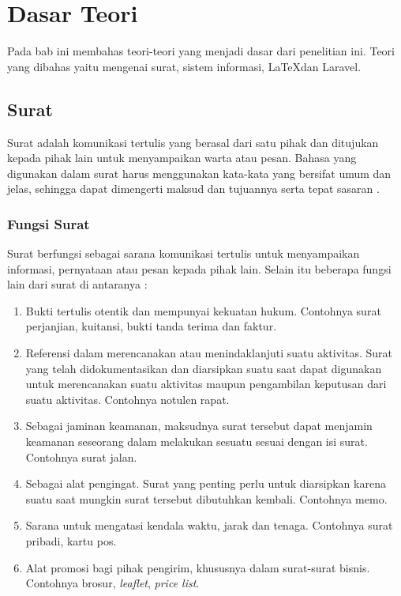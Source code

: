 \chapter{Dasar Teori}
\label{chap:dasar_teori}
Pada bab ini membahas teori-teori yang menjadi dasar dari penelitian ini. Teori yang dibahas yaitu mengenai surat, sistem informasi, \LaTeX dan Laravel.

\section{Surat}
\label{sec:surat}
Surat adalah komunikasi tertulis yang berasal dari satu pihak dan ditujukan kepada pihak lain untuk menyampaikan warta atau pesan. Bahasa yang digunakan dalam surat harus menggunakan kata-kata yang bersifat umum dan jelas, sehingga dapat dimengerti maksud dan tujuannya serta tepat sasaran \cite{Saiman:2002}.

\subsection{Fungsi Surat}
\label{sec:fungsi_surat}
Surat berfungsi sebagai sarana komunikasi tertulis untuk menyampaikan informasi, pernyataan atau pesan kepada pihak lain. Selain itu beberapa fungsi lain dari surat di antaranya \cite{Saiman:2002}:
\begin{enumerate}
	\item Bukti tertulis otentik dan mempunyai kekuatan hukum. Contohnya surat perjanjian, kuitansi, bukti tanda terima dan faktur.
	\item Referensi dalam merencanakan atau menindaklanjuti suatu aktivitas. Surat yang telah didokumentasikan dan diarsipkan suatu saat dapat digunakan untuk merencanakan suatu aktivitas maupun pengambilan keputusan dari suatu aktivitas. Contohnya notulen rapat.
	\item Sebagai jaminan keamanan, maksudnya surat tersebut dapat menjamin keamanan seseorang dalam melakukan sesuatu sesuai dengan isi surat. Contohnya surat jalan.
	\item Sebagai alat pengingat. Surat yang penting perlu untuk diarsipkan karena suatu saat mungkin surat tersebut dibutuhkan kembali. Contohnya memo.
	\item Sarana untuk mengatasi kendala waktu, jarak dan tenaga. Contohnya surat pribadi, kartu pos. 
	\item Alat promosi bagi pihak pengirim, khususnya dalam surat-surat bisnis. Contohnya brosur, \textit{leaflet}, \textit{price list}.
\end{enumerate}


